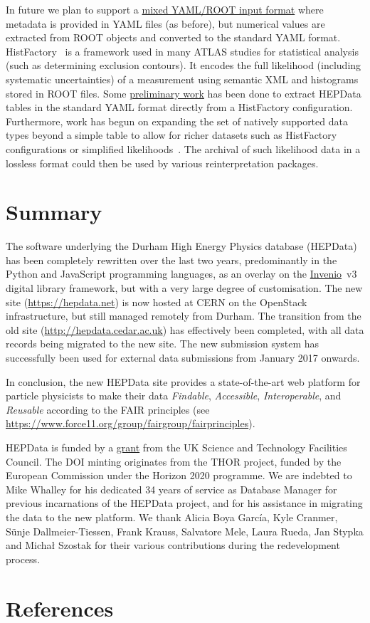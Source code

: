 \documentclass[a4paper]{jpconf}
\begin{document}
In future we plan to support a
\href{https://github.com/lukasheinrich/hepdata-rootcnv}{mixed YAML/ROOT input format}
where metadata is
provided in YAML files (as before), but numerical values are extracted from
ROOT objects and converted to the standard YAML format.
 HistFactory~\cite{Cranmer:1456844} is a framework used in many ATLAS studies
for statistical analysis (such as determining exclusion contours).  It encodes
the full likelihood (including systematic uncertainties) of a measurement
using semantic XML and histograms stored in ROOT files.  Some
\href{https://github.com/lukasheinrich/histfactory-cnvtools}{preliminary work}
has been done to extract HEPData tables in the standard YAML format directly
from a HistFactory configuration.  Furthermore, work has begun on expanding the
set of natively supported data types beyond a simple table to allow for richer
datasets such as HistFactory configurations or simplified
likelihoods~\cite{CMS:2242860}.  The archival of such likelihood data
in a lossless format could then be used by various reinterpretation packages.

\section{Summary}

The software underlying the Durham High Energy Physics database (HEPData) has
been completely rewritten over the last two years, predominantly in the Python
and JavaScript programming languages, as an overlay on the
\href{http://inveniosoftware.org}{Invenio}~v3 digital library framework, but
with a very large degree of customisation.  The new site
(\url{https://hepdata.net}) is now hosted at CERN on the OpenStack
infrastructure, but still managed remotely from Durham.  The transition from
the old site (\url{http://hepdata.cedar.ac.uk}) has effectively been completed,
with all data records being migrated to the new site.  The new submission
system has successfully been used for external data submissions from January
2017 onwards.

In conclusion, the new HEPData site provides a state-of-the-art web platform
for particle physicists to make their data \emph{Findable}, \emph{Accessible},
\emph{Interoperable}, and \emph{Reusable} according to the FAIR principles (see
\url{https://www.force11.org/group/fairgroup/fairprinciples}).

\ack
HEPData is funded by a
\href{http://gtr.rcuk.ac.uk/projects?ref=ST/N000315/1}{grant} from the UK
Science and Technology Facilities Council.  The DOI minting originates from the
THOR project, funded by the European Commission under the Horizon 2020
programme.  We are indebted to Mike Whalley for his dedicated 34 years of
service as Database Manager for previous incarnations of the HEPData project,
and for his assistance in migrating the data to the new platform.  We thank
Alicia Boya Garc\'{i}a, Kyle Cranmer, S\"unje Dallmeier-Tiessen, Frank Krauss,
Salvatore Mele, Laura Rueda, Jan Stypka and Micha\l{} Szostak for their various
contributions during the redevelopment process.

\section*{References}


\end{document}
